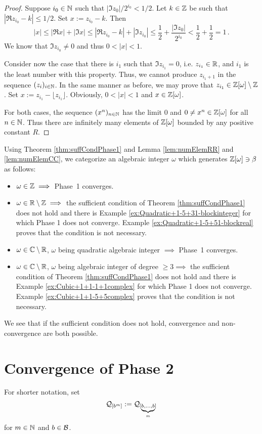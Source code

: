 \begin{proof}
Suppose $i_0\in\mathbb{N}$ such that $|\Im z_0|/2^{i_0}< 1/2$. Let $k\in\mathbb{Z}$ be such that $|\Re z_{i_0} -k|\leq 1/2$. Set $x:= z_{i_0}-k$. Then
$$
|x|\leq |\Re x| +|\Im x| \leq  |\Re z_{i_0} -k| + |\Im z_{i_0}| \leq \frac{1}{2} + \frac{|\Im z_0|}{2^{i_0}} < \frac{1}{2} +\frac{1}{2}=1\,.
$$
We know that $\Im z_{i_0} \neq 0$ and thus $0<|x|<1$.

Consider now the case that there is ${i_1}$ such that $\Im z_{i_1} = 0$, i.e. $z_{i_1}\in\mathbb{R}$, and $i_1$ is the least number with this property. Thus, we cannot produce $z_{i_1+1}$  in the sequence $(z_i)_{i\in\mathbb{N}}$. In the same manner as before, we may prove that  $z_{i_1} \in \mathbb{Z}[\omega]\setminus \mathbb{Z}$. Set $x:= z_{i_1}- \lfloor z_{i_1} \rfloor$. Obviously, $0<|x|<1$ and $x\in\mathbb{Z}[\omega]$.

For both cases, the sequence $(x^n)_{n\in\mathbb{N}}$ has the limit 0 and $0\neq x^n\in\mathbb{Z}[\omega]$ for all $n\in\mathbb{N}$. Thus there are infinitely many elements of $\mathbb{Z}[\omega]$ bounded by any positive constant $R$. 
\end{proof}


Using Theorem \ref{thm:suffCondPhase1} and Lemma \ref{lem:numElemRR} and \ref{lem:numElemCC}, we categorize an algebraic integer $\omega$ which generates $\mathbb{Z}[\omega] \ni \beta$ as follows:

\begin{itemize}
    \item $\omega \in \mathbb{Z} \implies$ Phase~1 converges.
    \item $\omega \in \mathbb{R}\setminus\mathbb{Z} \implies$ the sufficient condition of Theorem \ref{thm:suffCondPhase1} does not hold and there is  Example \ref{ex:Quadratic+1-5+31-blockinteger} for which Phase 1 does not converge.  Example \ref{ex:Quadratic+1-5+51-blockreal} proves that the condition is not necessary.
    \item $\omega \in \mathbb{C}\setminus\mathbb{R}$, $\omega$ being quadratic algebraic integer $\implies$ Phase~1 converges.
    \item $\omega \in \mathbb{C}\setminus\mathbb{R}$, $\omega$ being algebraic integer of degree $\geq 3 \implies$ the sufficient condition  of Theorem \ref{thm:suffCondPhase1} does not hold and there is  Example \ref{ex:Cubic+1+1-1+1complex} for which Phase 1 does not converge. Example \ref{ex:Cubic+1+1-5+5complex} proves that the condition is not necessary.
\end{itemize}
We see that if the sufficient condition does not hold, convergence and non-convergence are both possible.


\section{Convergence of Phase 2}
\label{sec:convergencePhase2}
For shorter notation, set 
$$
\mathcal{Q}_{[b^{m}]}:=\mathcal{Q}_{[\underbrace{\scriptstyle b,\dots,b}_m]}
$$ for $m \in \mathbb{N}$ and $b\in\mathcal{B}$.

